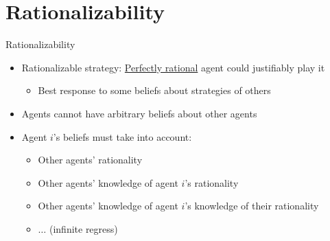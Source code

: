 \documentclass[11pt,aspectratio=169]{beamer}
\begin{document}
 \section{Rationalizability} 
  \begin{frame}{Rationalizability}
   \begin{itemize}[<+->]
   \setlength{\itemsep}{1.1em}
    \item \alert{Rationalizable} strategy: \underline{Perfectly rational} agent could justifiably play it
    \begin{itemize}
     \item Best response to some beliefs about strategies of others
    \end{itemize}
    \item Agents cannot have arbitrary beliefs about other agents
    \item Agent $i$'s beliefs must take into account:
    \begin{itemize}
     \setlength{\itemsep}{1.1em}
     \item Other agents' rationality
     \item Other agents' knowledge of agent $i$'s rationality
     \item Other agents' knowledge of agent $i$'s knowledge of their rationality
     \item $\dots$ (infinite regress)
    \end{itemize}
   \end{itemize}
  \end{frame}
  
\end{document}
